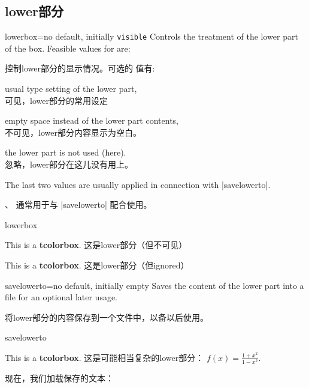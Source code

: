 \subsection{lower部分}

\begin{docTcbKey}{lowerbox}{=}{no default, initially \texttt{visible}}
Controls the treatment of the lower part of the box.
Feasible values for  are:

控制lower部分的显示情况。可选的  值有:
\begin{DescriptionL}{}
\item[\docValue{visible}]usual type setting of the lower part,
\\可见，lower部分的常用设定

\item[\docValue{invisible}]empty space instead of the lower part contents,
\\不可见，lower部分内容显示为空白。

\item[\docValue{ignored}]the lower part is not used (here).
\\忽略，lower部分在这儿没有用上。
\end{DescriptionL}

The last two values are usually applied in connection with |savelowerto|.

、 通常用于与 |savelowerto| 配合使用。

\begin{exdispExample}{lowerbox}
\begin{tcolorbox}[lowerbox=invisible,colback=white]
This is a \textbf{tcolorbox}.
\tcblower
这是lower部分（但不可见）
\end{tcolorbox}

\begin{tcolorbox}[lowerbox=ignored,colback=white]
This is a \textbf{tcolorbox}.
\tcblower
这是lower部分（但ignored）
\end{tcolorbox}
\end{exdispExample}
\end{docTcbKey}


\begin{docTcbKey}[][doc updated=2014-11-28]{savelowerto}{=}{no default, initially empty}
Saves the content of the lower part into a file for an optional later usage.

将lower部分的内容保存到一个文件中，以备以后使用。
\begin{exdispExample}{savelowerto}
\begin{tcolorbox}[lowerbox=invisible,savelowerto=\jobname_bspsave.tex,colback=white]
This is a \textbf{tcolorbox}.
\tcblower
这是可能相当复杂的lower部分：
$\displaystyle f(x)=\frac{1+x^2}{1-x^2}$.
\end{tcolorbox}

现在，我们加载保存的文本：\\

\end{exdispExample}
\end{docTcbKey}



